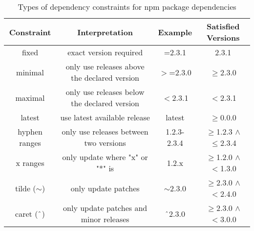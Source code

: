 \begin{table*}[h]
    \begin{center}
    \begin{tabular}{ c|c|c|c } 
         \textbf{Constraint} & \textbf{Interpretation} & \textbf{Example} & \textbf{Satisfied Versions} \\
        \hline
        fixed & exact version required & =2.3.1 & 2.3.1 \\ 
        \hline
        minimal & only use releases above the declared version & $>$=2.3.0 & $\geq$2.3.0 \\ 
        \hline
        maximal & only use releases below the declared version & $<$2.3.1 & $<$2.3.1 \\ 
        \hline
        latest & use latest available release & latest & $\geq$0.0.0 \\ 
        \hline
        hyphen ranges & only use releases between two versions & 1.2.3-2.3.4 & $\geq$1.2.3 $\land$ $\leq$2.3.4 \\ 
        \hline
        x ranges & only update where "x" or "*" is & 1.2.x & $\geq$1.2.0 $\land$ $<$1.3.0 \\ 
        \hline
        tilde ($\sim$) & only update patches & $\sim$2.3.0 & $\geq$2.3.0 $\land$ $<$2.4.0 \\ 
        \hline
        caret ($\string^$) & only update patches and minor releases & $\string^$2.3.0 & $\geq$2.3.0 $\land$ $<$3.0.0 \\ 
    \end{tabular}
    \end{center}
    \caption{
        \label{tab:semver}Types of dependency constraints for npm package dependencies
    }
\end{table*}
